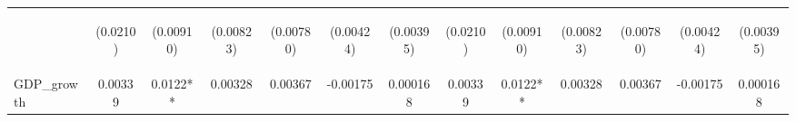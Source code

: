 \documentclass[]{article}
\begin{document}
\begin{center}
\begin{tabular}{lcccccccccccc}
\vspace{4pt} & \begin{footnotesize}(0.0210)\end{footnotesize} & \begin{footnotesize}(0.00910)\end{footnotesize} & \begin{footnotesize}(0.00823)\end{footnotesize} & \begin{footnotesize}(0.00780)\end{footnotesize} & \begin{footnotesize}(0.00424)\end{footnotesize} & \begin{footnotesize}(0.00395)\end{footnotesize} & \begin{footnotesize}(0.0210)\end{footnotesize} & \begin{footnotesize}(0.00910)\end{footnotesize} & \begin{footnotesize}(0.00823)\end{footnotesize} & \begin{footnotesize}(0.00780)\end{footnotesize} & \begin{footnotesize}(0.00424)\end{footnotesize} & \begin{footnotesize}(0.00395)\end{footnotesize} \\
GDP\_growth & 0.00339 & 0.0122** & 0.00328 & 0.00367 & -0.00175 & 0.000168 & 0.00339 & 0.0122** & 0.00328 & 0.00367 & -0.00175 & 0.000168 \\

\end{tabular}
\end{center}
\end{document}
